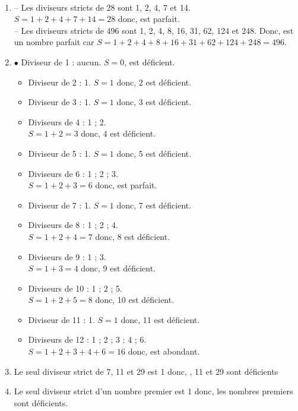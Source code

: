    \ \\ [-5mm]
   \begin{enumerate}
      \item -- Les diviseurs stricts de 28 sont 1, 2, 4, 7 et 14. \\
         $S =1+2+4+7+14 =28$ donc, { est parfait}. \\
         -- Les diviseurs stricts de 496 sont 1, 2, 4, 8, 16, 31, 62, 124 et 248. Donc, { est un nombre parfait} car
         $S =1+2+4+8+16+31+62+124+248 =496$.
      \item \textcolor{G1}{$\bullet$} Diviseur de 1 : aucun. $S =0$, { est déficient}.
      \begin{itemize}
         \item Diviseur de 2 : 1. $S =1$ donc, 2 est déficient.
         \item Diviseur de 3 : 1. $S =1$ donc, 3 est déficient.
         \item Diviseurs de 4 : 1 ; 2. \\
            $S =1+2 =3$ donc, 4 est déficient.
         \item Diviseur de 5 : 1. $S =1$ donc, 5 est déficient.
         \item Diviseurs de 6 : 1 ; 2 ; 3. \\
            $S =1+2+3 =6$ donc, { est parfait}.
         \item Diviseur de 7 : 1. $S =1$ donc, 7 est déficient.
         \item Diviseurs de 8 : 1 ; 2 ; 4. \\
            $S =1+2+4 =7$ donc, 8 est déficient.
         \item Diviseurs de 9 : 1 ; 3. \\
            $S =1+3 =4$ donc, 9 est déficient.
         \item Diviseurs de 10 : 1 ; 2 ; 5. \\
            $S =1+2+5 =8$ donc, 10 est déficient.
         \item Diviseur de 11 : 1. $S =1$ donc, 11 est déficient.
         \item Diviseurs de 12 : 1 ; 2 ; 3 ; 4 ; 6. \\
            $S =1+2+3+4+6 =16$ donc, { est abondant}.
      \end{itemize}
      \item Le seul diviseur strict de 7, 11 et 29 est 1 donc, {, 11 et 29 sont déficients}
      \item Le seul diviseur strict d'un nombre premier est 1 donc, {\blue les nombres premiers sont déficients}.
   \end{enumerate}

